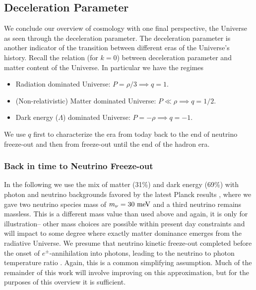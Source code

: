 
\subsection{Deceleration Parameter}
We conclude our overview of cosmology with one final perspective, the Universe as seen through the deceleration parameter.  The deceleration parameter is another indicator of the transition between different eras of the Universe's history.  Recall the relation  (for $k=0$)  between deceleration parameter and matter content of the Universe. In particular we have the regimes

\begin{itemize}
\item Radiation dominated Universe: $P=\rho/3 \implies q=1$.\\


\item  (Non-relativistic) Matter dominated Universe: $P\ll\rho \implies q=1/2$.\\



\item Dark energy ($\Lambda$) dominated Universe: $P=-\rho \implies q=-1$.\\

\end{itemize}
We use $q$ first to characterize the era from today back to the end of neutrino freeze-out and then from freeze-out until the end of the hadron era.


\subsubsection{Back in time to Neutrino Freeze-out}\label{recomb}
In the following we use the mix of matter  (31\%) and dark energy (69\%) with photon and neutrino backgrounds favored by the latest Planck results \cite{Planck}, where we gave two neutrino species mass of $m_\nu=30\text{ meV}$ and a third neutrino remains  massless.  This is a different mass value than used above and again, it is only for illustration-- other mass choices are possible within present day constraints and will impact to some degree where exactly matter dominance emerges from the radiative Universe.  We presume  that neutrino kinetic freeze-out completed before the onset of $e^\pm$-annihilation into  photons, leading to the neutrino to photon temperature ratio . Again, this is a common simplifying assumption.  Much of the remainder of this work will involve improving on this approximation, but for the purposes of this overview it is sufficient.

